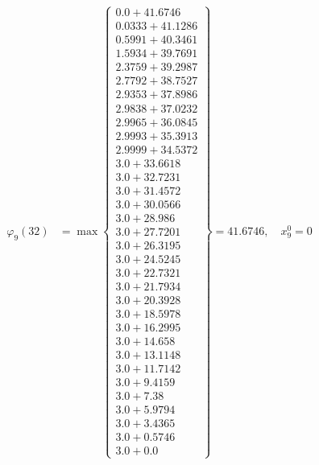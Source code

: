 \documentclass{article}
\begin{document}
\begin{align*}
  
\varphi_{9}(32) &= \max \left\{ \begin{array}{c}
0.0 + 41.6746 \\
 0.0333 + 41.1286 \\
 0.5991 + 40.3461 \\
 1.5934 + 39.7691 \\
 2.3759 + 39.2987 \\
 2.7792 + 38.7527 \\
 2.9353 + 37.8986 \\
 2.9838 + 37.0232 \\
 2.9965 + 36.0845 \\
 2.9993 + 35.3913 \\
 2.9999 + 34.5372 \\
 3.0 + 33.6618 \\
 3.0 + 32.7231 \\
 3.0 + 31.4572 \\
 3.0 + 30.0566 \\
 3.0 + 28.986 \\
 3.0 + 27.7201 \\
 3.0 + 26.3195 \\
 3.0 + 24.5245 \\
 3.0 + 22.7321 \\
 3.0 + 21.7934 \\
 3.0 + 20.3928 \\
 3.0 + 18.5978 \\
 3.0 + 16.2995 \\
 3.0 + 14.658 \\
 3.0 + 13.1148 \\
 3.0 + 11.7142 \\
 3.0 + 9.4159 \\
 3.0 + 7.38 \\
 3.0 + 5.9794 \\
 3.0 + 3.4365 \\
 3.0 + 0.5746 \\
 3.0 + 0.0
\end{array} \right\}=41.6746,\quad x_{9}^0=0\\
  
  
  

\end{align*}
\end{document}
